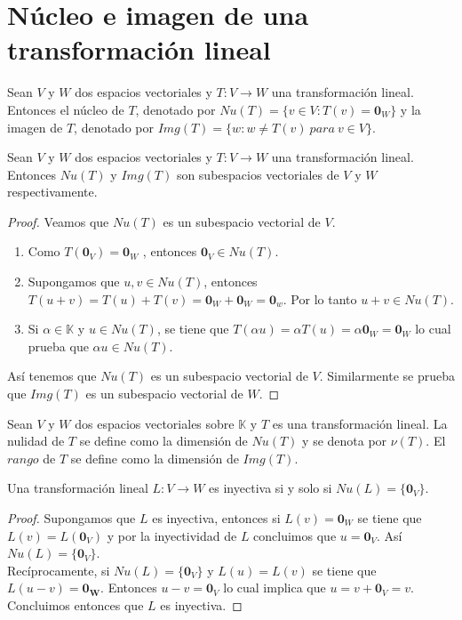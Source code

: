 \section{Núcleo e imagen de una transformación lineal}
\begin{dfn}
Sean $V$ y $W$ dos espacios vectoriales y $T : V \to W$ una transformación lineal. Entonces el núcleo de $T$, denotado por $Nu(T) = \{v \in V : T(v) = \mathbf{0}_W\}$ y la imagen de $T$, denotado por $Img(T) = \{w : w \neq T(v) \ para \ v \in V\}$.
\end{dfn}

\begin{theorem}
Sean $V$ y $W$ dos espacios vectoriales y $T : V \to W$ una transformación lineal. Entonces $Nu(T)$ y $Img(T)$ son subespacios vectoriales de $V$ y $W$ respectivamente.
\end{theorem}

\begin{proof}
Veamos que $Nu(T)$ es un subespacio vectorial de $V$.
\begin{enumerate}
\item Como $T(\mathbf{0}_V)=\mathbf{0}_W$ , entonces $\mathbf{0}_V \in Nu(T)$.
\item Supongamos que $u , v \in Nu(T)$, entonces $T(u+v) = T(u) + T(v) = \mathbf{0}_W + \mathbf{0}_W = \mathbf{0}_w$. Por lo tanto $u+v \in Nu(T)$.
\item Si $\alpha \in \mathbb{K}$ y $u \in Nu(T)$, se tiene que $T(\alpha u) = \alpha T(u) = \alpha \mathbf{0}_W = \mathbf{0}_W$ lo cual prueba que $\alpha u \in Nu(T)$.
\end{enumerate}
Así tenemos que $Nu(T)$ es un subespacio vectorial de $V$. Similarmente se prueba que $Img(T)$ es un subespacio vectorial de $W$.
\end{proof}

\begin{dfn}
Sean $V$ y $W$ dos espacios vectoriales sobre $\mathbb{K}$ y $T$ es una transformación lineal. La nulidad de $T$ se define como la dimensión de $Nu(T)$ y se denota por $\nu (T)$. El $rango$ de $T$ se define como la dimensión de $Img(T)$.
\end{dfn}

\begin{theorem}
Una transformación lineal $L : V \to W$ es inyectiva si y solo si $Nu(L) = \{\mathbf{0}_V\}$.
\end{theorem}

\begin{proof}
Supongamos que $L$ es inyectiva, entonces si $L(v) = \mathbf{0}_W$ se tiene que $L(v) = L(\mathbf{0}_V)$ y por la inyectividad de $L$ concluimos que $u = \mathbf{0}_V$. Así $Nu(L) = \{\mathbf{0}_V\}$.\\
Recíprocamente, si $Nu(L) = \{\mathbf{0}_V\}$ y $L(u) = L(v)$ se tiene que $L(u - v) = \mathbf{0_W}$. Entonces $u -v = \mathbf{0}_V$ lo cual implica que $u = v + \mathbf{0}_V = v$. Concluimos entonces que $L$ es inyectiva.
\end{proof}

